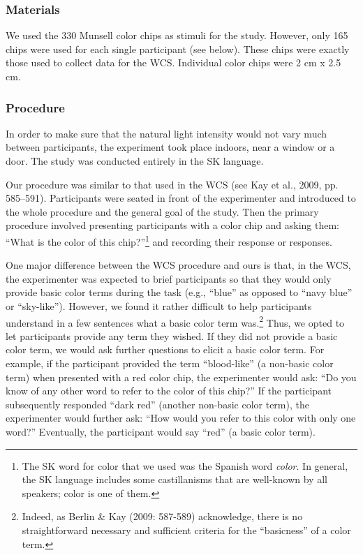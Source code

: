 \documentclass[
  english,
  ,man,floatsintext]{apa6}
\begin{document}
\hypertarget{materials}{%
\subsubsection{Materials}\label{materials}}

We used the 330 Munsell color chips as stimuli for the study. However, only 165 chips were used for each single participant (see below). These chips were exactly those used to collect data for the WCS. Individual color chips were 2 cm x 2.5 cm.

\hypertarget{procedure}{%
\subsubsection{Procedure}\label{procedure}}

In order to make sure that the natural light intensity would not vary much between participants, the experiment took place indoors, near a window or a door. The study was conducted entirely in the SK language.

Our procedure was similar to that used in the WCS (see Kay et al., 2009, pp. 585--591). Participants were seated in front of the experimenter and introduced to the whole procedure and the general goal of the study. Then the primary procedure involved presenting participants with a color chip and asking them: \enquote{What is the color of this chip?}\footnote{The SK word for color that we used was the Spanish word \emph{color}. In general, the SK language includes some castillanisms that are well-known by all speakers; color is one of them.} and recording their response or responses.

One major difference between the WCS procedure and ours is that, in the WCS, the experimenter was expected to brief participants so that they would only provide basic color terms during the task (e.g., \enquote{blue} as opposed to \enquote{navy blue} or \enquote{sky-like}). However, we found it rather difficult to help participants understand in a few sentences what a basic color term was.\footnote{Indeed, as Berlin \& Kay (2009: 587-589) acknowledge, there is no straightforward necessary and sufficient criteria for the \enquote{basicness} of a color term.} Thus, we opted to let participants provide any term they wished. If they did not provide a basic color term, we would ask further questions to elicit a basic color term. For example, if the participant provided the term \enquote{blood-like} (a non-basic color term) when presented with a red color chip, the experimenter would ask: \enquote{Do you know of any other word to refer to the color of this chip?} If the participant subsequently responded \enquote{dark red} (another non-basic color term), the experimenter would further ask: \enquote{How would you refer to this color with only one word?} Eventually, the participant would say \enquote{red} (a basic color term).
\end{document}
